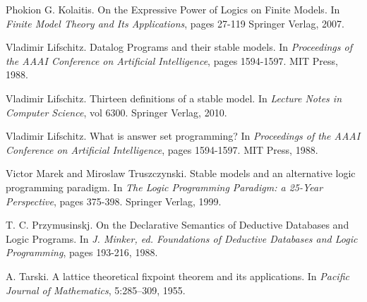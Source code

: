\documentclass[11pt]{article}
\begin{document}
\begin{thebibliography}{16}
  Phokion G. Kolaitis.
  On the Expressive Power of Logics on Finite Models.
  In \textit{Finite Model Theory and Its Applications}, pages 27-119
  Springer Verlag, 2007.

  Vladimir Lifschitz. 
  Datalog Programs and their stable models.
  In \textit{Proceedings of the AAAI Conference on Artificial Intelligence}, pages 1594-1597. 
  MIT Press, 1988.

  Vladimir Lifschitz. 
  Thirteen definitions of a stable model.  
  In \textit{Lecture Notes in Computer Science}, vol 6300. 
  Springer Verlag, 2010.

  Vladimir Lifschitz. 
  What is answer set programming? 
  In \textit{Proceedings of the AAAI Conference on Artificial Intelligence}, pages 1594-1597. 
  MIT Press, 1988.

  Victor Marek and Miroslaw Truszczynski. 
  Stable models and an alternative logic programming paradigm.  
  In \textit{The Logic Programming Paradigm: a 25-Year Perspective}, pages 375-398. 
  Springer Verlag, 1999.
  
  T. C. Przymusinskj.
  On the Declarative Semantics of Deductive Databases and Logic Programs.
  In \emph{J. Minker, ed. Foundations of Deductive Databases and Logic Programming}, pages 193-216, 1988.

  A. Tarski. 
  A lattice theoretical fixpoint theorem and its applications. 
  In \textit{Pacific Journal of Mathematics}, 5:285–309, 1955.
\end{thebibliography}
\end{document}
